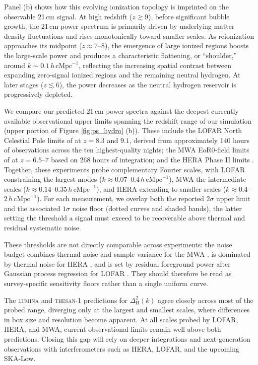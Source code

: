 \documentclass[apj,twocolumn, appendixfloats, twocolappendix, numberedappendix, tighten]{openjournal}
\DeclareRobustCommand{\lumina}{\mbox{\textsc{lumina}}\xspace}
\begin{document}
Panel (b) shows how this evolving ionization topology is imprinted on the observable 21\,cm signal. At high redshift ($z \gtrsim 9$), before significant bubble growth, the 21\,cm power spectrum is primarily driven by underlying matter density fluctuations and rises monotonically toward smaller scales. As reionization approaches its midpoint ($z \approx 7$--$8$), the emergence of large ionized regions boosts the large-scale power and produces a characteristic flattening, or ``shoulder,'' around $k \sim 0.1\,h\,\mathrm{cMpc}^{-1}$, reflecting the increasing spatial contrast between expanding zero-signal ionized regions and the remaining neutral hydrogen. At later stages ($z \lesssim 6$), the power decreases as the neutral hydrogen reservoir is progressively depleted.


We compare our predicted 21\,cm power spectra against the deepest currently available observational upper limits spanning the redshift range of our simulation (upper portion of Figure \ref{fig:ps_hydro} (b)). These include the LOFAR North Celestial Pole limits of \citet{Mertens2025} at $z=8.3$ and $9.1$, derived from approximately 140 hours of observations across the ten highest-quality nights; the MWA EoR0-field limits of \citet{Nunhokee2025} at $z=6.5$--$7$ based on 268 hours of integration; and the HERA Phase II limits \citep[][at $z=7.05$ and $7.63$]{HERA2026}. Together, these experiments probe complementary Fourier scales, with LOFAR constraining the largest modes ($k \approx 0.07$--$0.4\,h\,\mathrm{cMpc}^{-1}$), MWA the intermediate scales ($k \approx 0.14$--$0.35\,h\,\mathrm{cMpc}^{-1}$), and HERA extending to smaller scales ($k \approx 0.4$--$2\,h\,\mathrm{cMpc}^{-1}$). For each measurement, we overlay both the reported $2\sigma$ upper limit and the associated $1\sigma$ noise floor (dotted curves and shaded bands), the latter setting the threshold a signal must exceed to be recoverable above thermal and residual systematic noise.


These thresholds are not directly comparable across experiments: the noise budget combines thermal noise and sample variance for the MWA \citep{Nunhokee2025}, is dominated by thermal noise for HERA \citep{HERA2026}, and is set by residual foreground power after Gaussian process regression for LOFAR \citep{Mertens2025}. They should therefore be read as survey-specific sensitivity floors rather than a single uniform curve.


The \lumina and \textsc{thesan-1} predictions for $\Delta^2_\mathrm{H}(k)$ agree closely across most of the probed range, diverging only at the largest and smallest scales, where differences in box size and resolution become apparent. At all scales probed by LOFAR, HERA, and MWA, current observational limits remain well above both predictions. Closing this gap will rely on deeper integrations and next-generation observations with interferometers such as HERA, LOFAR, and the upcoming SKA-Low.
\end{document}
